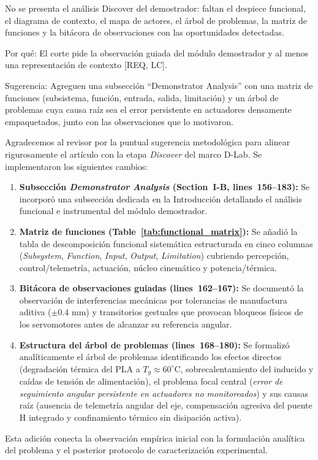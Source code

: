 \documentclass{LabDSTresponse}
\begin{document}
{No se presenta el análisis Discover del demostrador: faltan el despiece funcional, el diagrama de contexto, el mapa de actores, el árbol de problemas, la matriz de funciones y la bitácora de observaciones con las oportunidades detectadas.

Por qué: El corte pide la observación guiada del módulo demostrador y al menos una representación de contexto [REQ, LC].

Sugerencia: Agreguen una subsección “Demonstrator Analysis” con una matriz de funciones (subsistema, función, entrada, salida, limitación) y un árbol de problemas cuya causa raíz sea el error persistente en actuadores densamente empaquetados, junto con las observaciones que lo motivaron.}
{Agradecemos al revisor por la puntual sugerencia metodológica para alinear rigurosamente el artículo con la etapa \textit{Discover} del marco D-Lab. Se implementaron los siguientes cambios:
\begin{enumerate}
    \item \textbf{Subsección \textit{Demonstrator Analysis} (Section~I-B, lines~156--183):} Se incorporó una subsección dedicada en la Introducción detallando el análisis funcional e instrumental del módulo demostrador.
    \item \textbf{Matriz de funciones (Table~\ref{tab:functional_matrix}):} Se añadió la tabla de descomposición funcional sistemática estructurada en cinco columnas (\textit{Subsystem}, \textit{Function}, \textit{Input}, \textit{Output}, \textit{Limitation}) cubriendo percepción, control/telemetría, actuación, núcleo cinemático y potencia/térmica.
    \item \textbf{Bitácora de observaciones guiadas (lines~162--167):} Se documentó la observación de interferencias mecánicas por tolerancias de manufactura aditiva ($\pm 0.4\text{ mm}$) y transitorios gestuales que provocan bloqueos físicos de los servomotores antes de alcanzar su referencia angular.
    \item \textbf{Estructura del árbol de problemas (lines~168--180):} Se formalizó analíticamente el árbol de problemas identificando los efectos directos (degradación térmica del PLA a $T_g \approx 60^\circ\text{C}$, sobrecalentamiento del inducido y caídas de tensión de alimentación), el problema focal central (\textit{error de seguimiento angular persistente en actuadores no monitoreados}) y sus causas raíz (ausencia de telemetría angular del eje, compensación agresiva del puente H integrado y confinamiento térmico sin disipación activa).
\end{enumerate}
Esta adición conecta la observación empírica inicial con la formulación analítica del problema y el posterior protocolo de caracterización experimental.}
\end{document}
